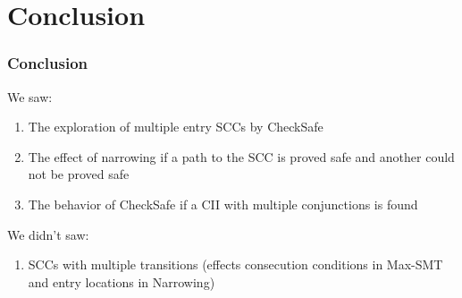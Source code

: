 \documentclass{beamer}
\begin{document}
\begin{frame}
\begin{overlayarea}{\linewidth}{\textheight}




  \end{overlayarea}
  
\end{frame}

\section{Conclusion}

\begin{frame}
  \frametitle{Conclusion}
  \begin{block}{We saw:}
    \begin{enumerate}
    \item The exploration of multiple entry SCCs by CheckSafe
    \item The effect of narrowing if a path to the SCC is proved safe and another could not be proved safe
    \item The behavior of CheckSafe if a CII with multiple conjunctions is found
    \end{enumerate}
  \end{block}
  \begin{block}{We didn't saw:}
    \begin{enumerate}
    \item SCCs with multiple transitions (effects consecution conditions in Max-SMT and entry locations in Narrowing)
    \end{enumerate}
  \end{block}
\end{frame}
\end{document}
